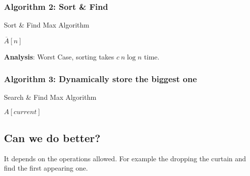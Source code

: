 \subsubsection{Algorithm 2: Sort \& Find}
\begin{algorithm}[H]
\caption{Sort \& Find Max Algorithm}\label{Sort_and_Find_Max_Algorithm}
\begin{algorithmic}[1]
\Return $\overline{A}[n]$
\EndProcedure
\end{algorithmic}
\end{algorithm}

\textbf{Analysis}: Worst Case, sorting takes $c\ n\log n$ time.

\subsubsection{Algorithm 3: Dynamically store the biggest one}
\begin{algorithm}[H]
\caption{Search \& Find Max Algorithm}\label{Search_and_Find_Max_Algorithm}
\begin{algorithmic}[1]
  \EndIf
\EndFor
\Return $A[current]$
\EndProcedure
\end{algorithmic}
\end{algorithm}

\subsection{Can we do better?}

It depends on the operations allowed. For example the dropping the curtain and
find the first appearing one.

